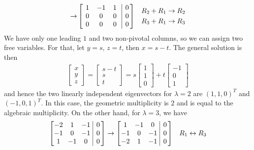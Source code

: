 \begin{solution}
\begin{align*}
\to&
\left[\begin{array}{@{\,}wc{10pt}wc{10pt}wc{10pt}|c@{\,}}
1 & -1 & 1 & 0 \\
0 & 0 & 0 & 0 \\
0 & 0 & 0 & 0
\end{array}\right] & \begin{aligned}
R_2 + R_1 &\to R_2 \\
R_3 + R_1 &\to R_3 \\
\end{aligned}
\end{align*}
We have only one leading $1$ and two non-pivotal columns, so we can assign two free variables. For that, let $y = s$, $z = t$, then $x = s - t$. The general solution is then
\begin{align*}
\begin{bmatrix}
x \\
y \\ 
z
\end{bmatrix}
=
\begin{bmatrix}
s - t \\
s \\ 
t
\end{bmatrix}
=
s
\begin{bmatrix}
1 \\
1 \\
0
\end{bmatrix}
+ t 
\begin{bmatrix}
-1 \\
0 \\
1
\end{bmatrix}
\end{align*}
and hence the two linearly independent eigenvectors for $\lambda = 2$ are $(1,1,0)^T$ and $(-1,0,1)^T$. In this case, the geometric multiplicity is $2$ and is equal to the algebraic multiplicity. On the other hand, for $\lambda = 3$, we have
\begin{align*}
\left[\begin{array}{@{\,}wc{10pt}wc{10pt}wc{10pt}|c@{\,}}
-2 & 1 & -1 & 0 \\
-1 & 0 & -1 & 0 \\
1 & -1 & 0 & 0
\end{array}\right] 
&\to    
\left[\begin{array}{@{\,}wc{10pt}wc{10pt}wc{10pt}|c@{\,}}
1 & -1 & 0 & 0 \\
-1 & 0 & -1 & 0 \\
-2 & 1 & -1 & 0 
\end{array}\right] & R_1 \leftrightarrow R_3 \\

\end{align*}
\end{solution}
